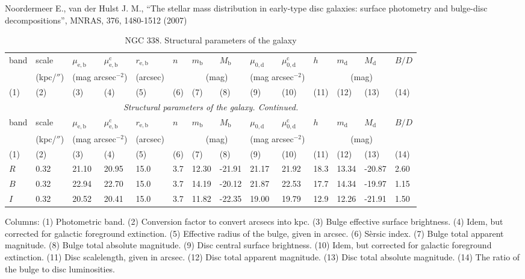 \documentclass[english,10pt]{article}
\def\mm{\mathrm}
\begin{document}
\noindent
Noordermeer E., van der Hulst J. M., 
``The stellar mass distribution in early-type disc galaxies: surface
photometry and bulge-disc decompositions'', 
MNRAS, 376, 1480-1512 (2007)

\begin{longtable}[c]{llllllllllllll}
\caption{NGC 338. Structural parameters of the galaxy}\label{GAL}  \\ 
\hline 
band & scale & 
$\mu_\mm{e,b}$ & $\mu_\mm{e,b}^\mm{c}$ & $r_\mm{e,b}$ & 
$n$ & $m_\mm{b}$ & $M_\mm{b}$ & 
$\mu_\mm{0,d}$ & $\mu_\mm{0,d}^\mm{c}$ & $h$ & 
$m_\mm{d}$ & $M_\mm{d}$ & $B/D$ \\ 
& (kpc/$''$) & \multicolumn{2}{c}{(mag arcsec$^{-2}$)} & (arcsec) 
& & \multicolumn{2}{c}{(mag)} & 
\multicolumn{2}{c}{(mag arcsec$^{-2}$)} & & 
\multicolumn{2}{c}{(mag)} & \\
(1)&(2)&(3)&(4)&(5)&(6)&(7)&(8)&(9)&(10)&(11)&(12)&(13)&(14) \\ 
\hline
\endfirsthead 
\hline
\multicolumn{14}{c}{\small\slshape Structural parameters of the galaxy. 
Continued. } \\ \hline
band & scale & 
$\mu_\mm{e,b}$ & $\mu_\mm{e,b}^\mm{c}$ & $r_\mm{e,b}$ & 
$n$ & $m_\mm{b}$ & $M_\mm{b}$ & 
$\mu_\mm{0,d}$ & $\mu_\mm{0,d}^\mm{c}$ & $h$ & 
$m_\mm{d}$ & $M_\mm{d}$ & $B/D$ \\ 
& (kpc/$''$) & \multicolumn{2}{c}{(mag arcsec$^{-2}$)} & (arcsec) 
& & \multicolumn{2}{c}{(mag)} & 
\multicolumn{2}{c}{(mag arcsec$^{-2}$)} & & 
\multicolumn{2}{c}{(mag)} & \\
(1)&(2)&(3)&(4)&(5)&(6)&(7)&(8)&(9)&(10)&(11)&(12)&(13)&(14) \\
\hline
\endhead 
\hline
$R$ & 0.32 & 21.10 & 20.95 & 15.0 & 3.7 & 12.30 & -21.91 & 
21.17 & 21.92 & 18.3 & 13.34 & -20.87 & 2.60 \tabularnewline

$B$ & 0.32 & 22.94 & 22.70 & 15.0 & 3.7 & 14.19 & -20.12 & 
21.87 & 22.53 & 17.7 & 14.34 & -19.97 & 1.15 \tabularnewline

$I$ & 0.32 & 20.52 & 20.41 & 15.0 & 3.7 & 11.82 & -22.35 & 
19.00 & 19.79 & 12.9 & 12.26 & -21.91 & 1.50 \tabularnewline
\hline
\end{longtable}

Columns: 
(1) Photometric band. 
(2) Conversion factor to convert arcsecs into kpc.
(3) Bulge effective surface brightness. 
(4) Idem, but corrected for galactic foreground extinction.
(5) Effective radius of the bulge, given in arcsec.
(6) S\`ersic index. 
(7) Bulge total apparent magnitude.
(8) Bulge total absolute magnitude.
(9) Disc central surface brightness. 
(10) Idem, but corrected for galactic foreground extinction.
(11) Disc scalelength, given in arcsec.
(12) Disc total apparent magnitude.
(13) Disc total absolute magnitude. 
(14) The ratio of the bulge to disc luminosities. 
\end{document}
